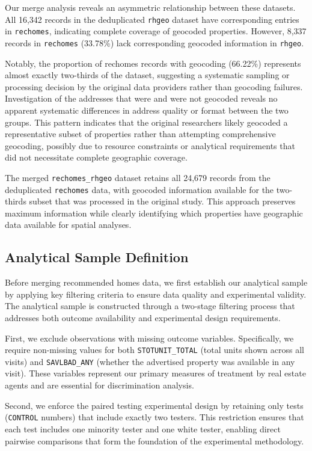 \documentclass{article}
\begin{document}
Our merge analysis reveals an asymmetric relationship between these datasets. All 16,342 records in the deduplicated \texttt{rhgeo} dataset have corresponding entries in \texttt{rechomes}, indicating complete coverage of geocoded properties. However, 8,337 records in \texttt{rechomes} (33.78\%) lack corresponding geocoded information in \texttt{rhgeo}. 

Notably, the proportion of rechomes records with geocoding (66.22\%) represents almost exactly two-thirds of the dataset, suggesting a systematic sampling or processing decision by the original data providers rather than geocoding failures. Investigation of the addresses that were and were not geocoded reveals no apparent systematic differences in address quality or format between the two groups. This pattern indicates that the original researchers likely geocoded a representative subset of properties rather than attempting comprehensive geocoding, possibly due to resource constraints or analytical requirements that did not necessitate complete geographic coverage.

The merged \texttt{rechomes\_rhgeo} dataset retains all 24,679 records from the deduplicated \texttt{rechomes} data, with geocoded information available for the two-thirds subset that was processed in the original study. This approach preserves maximum information while clearly identifying which properties have geographic data available for spatial analyses.

\subsection{Analytical Sample Definition}

Before merging recommended homes data, we first establish our analytical sample by applying key filtering criteria to ensure data quality and experimental validity. The analytical sample is constructed through a two-stage filtering process that addresses both outcome availability and experimental design requirements.

First, we exclude observations with missing outcome variables. Specifically, we require non-missing values for both \texttt{STOTUNIT\_TOTAL} (total units shown across all visits) and \texttt{SAVLBAD\_ANY} (whether the advertised property was available in any visit). These variables represent our primary measures of treatment by real estate agents and are essential for discrimination analysis.

Second, we enforce the paired testing experimental design by retaining only tests (\texttt{CONTROL} numbers) that include exactly two testers. This restriction ensures that each test includes one minority tester and one white tester, enabling direct pairwise comparisons that form the foundation of the experimental methodology.
\end{document}
